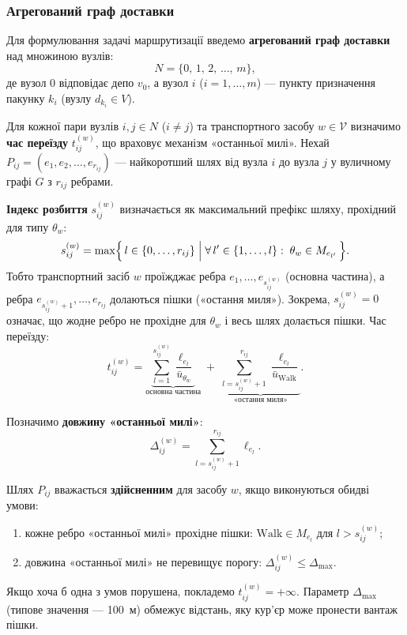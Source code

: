 \documentclass[14pt,a4paper]{extarticle}
\theoremstyle{definition}
\theoremstyle{plain}
\begin{document}
\subsubsection{Агрегований граф доставки}

Для формулювання задачі маршрутизації введемо \textbf{агрегований граф доставки} над множиною вузлів:
\[
    N = \{0,\, 1,\, 2,\, \ldots,\, m\},
\]
де вузол $0$ відповідає депо $v_0$, а вузол $i$ ($i = 1, \ldots, m$) --- пункту призначення пакунку $k_i$ (вузлу $d_{k_i} \in V$).

Для кожної пари вузлів $i, j \in N$ ($i \neq j$) та транспортного засобу $w \in \mathcal{V}$ визначимо \textbf{час переїзду} $t_{ij}^{(w)}$, що враховує механізм «останньої милі». Нехай $P_{ij} = (e_1, e_2, \ldots, e_{r_{ij}})$ --- найкоротший шлях від вузла $i$ до вузла $j$ у вуличному графі $G$ з $r_{ij}$ ребрами.

\textbf{Індекс розбиття} $s_{ij}^{(w)}$ визначається як максимальний префікс шляху, прохідний для типу $\theta_w$:
\[
    s_{ij}^{(w)} = \max\Bigl\{\, l \in \{0, \ldots, r_{ij}\} \;\Big|\; \forall\, l' \in \{1, \ldots, l\}:\; \theta_w \in M_{e_{l'}} \,\Bigr\}.
\]
Тобто транспортний засіб $w$ проїжджає ребра $e_1, \ldots, e_{s_{ij}^{(w)}}$ (основна частина), а ребра $e_{s_{ij}^{(w)}+1}, \ldots, e_{r_{ij}}$ долаються пішки («остання миля»). Зокрема, $s_{ij}^{(w)}=0$  означає, що жодне ребро не прохідне для $\theta_{w}$ і весь шлях долається пішки. Час переїзду:
\[
    t_{ij}^{(w)} = \underbrace{\sum_{l=1}^{s_{ij}^{(w)}} \frac{\ell_{e_l}}{\bar{u}_{\theta_w}}}_{\text{основна частина}} \;+\; \underbrace{\sum_{l=s_{ij}^{(w)}+1}^{r_{ij}} \frac{\ell_{e_l}}{\bar{u}_{\mathrm{Walk}}}}_{\text{«остання миля»}}.
\]

Позначимо \textbf{довжину «останньої милі»}:
\[
    \Delta_{ij}^{(w)} = \sum_{l=s_{ij}^{(w)}+1}^{r_{ij}} \ell_{e_l}.
\]

Шлях $P_{ij}$ вважається \textbf{здійсненним} для засобу $w$, якщо виконуються обидві умови:
\begin{enumerate}[leftmargin=2em, label=(\alph*)]
    \item кожне ребро «останньої милі» прохідне пішки: $\mathrm{Walk} \in M_{e_l}$ для $l > s_{ij}^{(w)}$;
    \item довжина «останньої милі» не перевищує порогу: $\Delta_{ij}^{(w)} \leq \Delta_{\max}$.
\end{enumerate}
Якщо хоча б одна з умов порушена, покладемо $t_{ij}^{(w)} = +\infty$. Параметр $\Delta_{\max}$ (типове значення --- 100~м) обмежує відстань, яку кур'єр може пронести вантаж пішки.
\end{document}
